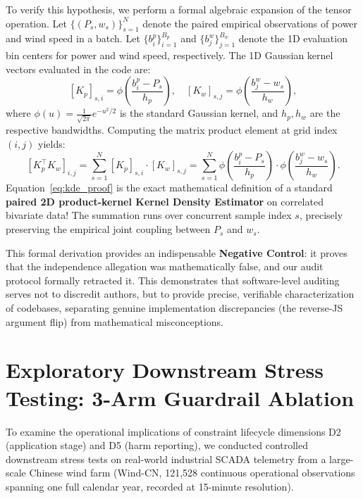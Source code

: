 \documentclass[preprint,3p,times]{elsarticle}
\begin{document}
To verify this hypothesis, we perform a formal algebraic expansion of the tensor operation. Let $\{ (P_s, w_s) \}_{s=1}^N$ denote the paired empirical observations of power and wind speed in a batch. Let $\{b_i^p\}_{i=1}^{B_p}$ and $\{b_j^w\}_{j=1}^{B_w}$ denote the 1D evaluation bin centers for power and wind speed, respectively. The 1D Gaussian kernel vectors evaluated in the code are:
\begin{equation}
\left[K_p\right]_{s,i} = \phi\left( \frac{b_i^p - P_s}{h_p} \right), \quad \left[K_w\right]_{s,j} = \phi\left( \frac{b_j^w - w_s}{h_w} \right),
\label{eq:kernel_eval}
\end{equation}
where $\phi(u) = \frac{1}{\sqrt{2\pi}} e^{-u^2/2}$ is the standard Gaussian kernel, and $h_p, h_w$ are the respective bandwidths. Computing the matrix product element at grid index $(i,j)$ yields:
\begin{equation}
\left[ K_p^\top K_w \right]_{i,j} = \sum_{s=1}^N \left[K_p\right]_{s,i} \cdot \left[K_w\right]_{s,j} = \sum_{s=1}^N \phi\left( \frac{b_i^p - P_s}{h_p} \right) \cdot \phi\left( \frac{b_j^w - w_s}{h_w} \right).
\label{eq:kde_proof}
\end{equation}
Equation~\eqref{eq:kde_proof} is the exact mathematical definition of a standard \textbf{paired 2D product-kernel Kernel Density Estimator} on correlated bivariate data! The summation runs over concurrent sample index $s$, precisely preserving the empirical joint coupling between $P_s$ and $w_s$. 

This formal derivation provides an indispensable \textbf{Negative Control}: it proves that the independence allegation was mathematically false, and our audit protocol formally retracted it. This demonstrates that software-level auditing serves not to discredit authors, but to provide precise, verifiable characterization of codebases, separating genuine implementation discrepancies (the reverse-JS argument flip) from mathematical misconceptions.

\section{Exploratory Downstream Stress Testing: 3-Arm Guardrail Ablation}
\label{sec:stress_test}

To examine the operational implications of constraint lifecycle dimensions D2 (application stage) and D5 (harm reporting), we conducted controlled downstream stress tests on real-world industrial SCADA telemetry from a large-scale Chinese wind farm (Wind-CN, 121,528 continuous operational observations spanning one full calendar year, recorded at 15-minute resolution).
\end{document}
